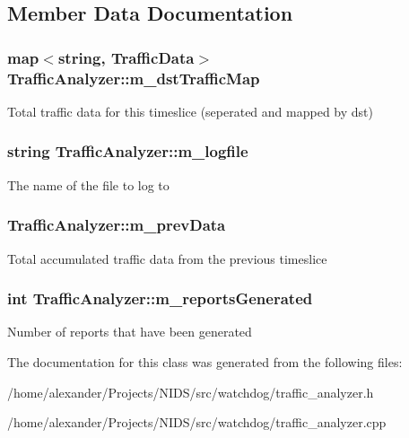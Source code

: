 \subsection{Member Data Documentation}
\hypertarget{classTrafficAnalyzer_aabed7c9e5a09fdddd78bbf797e267a2f}{
\subsubsection[{m\-\_\-dst\-Traffic\-Map}]{\setlength{\rightskip}{0pt plus 5cm}map$<$string, {\bf Traffic\-Data}$>$ Traffic\-Analyzer\-::m\-\_\-dst\-Traffic\-Map\hspace{0.3cm}{\ttfamily [private]}}}\label{classTrafficAnalyzer_aabed7c9e5a09fdddd78bbf797e267a2f}
Total traffic data for this timeslice (seperated and mapped by dst) \hypertarget{classTrafficAnalyzer_add716c01da39c385a97a311b465deeb4}{
\subsubsection[{m\-\_\-logfile}]{\setlength{\rightskip}{0pt plus 5cm}string Traffic\-Analyzer\-::m\-\_\-logfile\hspace{0.3cm}{\ttfamily [private]}}}\label{classTrafficAnalyzer_add716c01da39c385a97a311b465deeb4}
The name of the file to log to \hypertarget{classTrafficAnalyzer_a734268651e33bf00e26314039c7d2647}{
\subsubsection[{m\-\_\-prev\-Data}]{ Traffic\-Analyzer\-::m\-\_\-prev\-Data\hspace{0.3cm}{\ttfamily [private]}}}\label{classTrafficAnalyzer_a734268651e33bf00e26314039c7d2647}
Total accumulated traffic data from the previous timeslice \hypertarget{classTrafficAnalyzer_aedc4b5279b06fa8b9cefeedcbddcfb74}{
\subsubsection[{m\-\_\-reports\-Generated}]{\setlength{\rightskip}{0pt plus 5cm}int Traffic\-Analyzer\-::m\-\_\-reports\-Generated\hspace{0.3cm}{\ttfamily [private]}}}\label{classTrafficAnalyzer_aedc4b5279b06fa8b9cefeedcbddcfb74}
Number of reports that have been generated 

The documentation for this class was generated from the following files\-:\begin{DoxyCompactItemize}
\item 
/home/alexander/\-Projects/\-N\-I\-D\-S/src/watchdog/traffic\-\_\-analyzer.\-h\item 
/home/alexander/\-Projects/\-N\-I\-D\-S/src/watchdog/traffic\-\_\-analyzer.\-cpp\end{DoxyCompactItemize}
